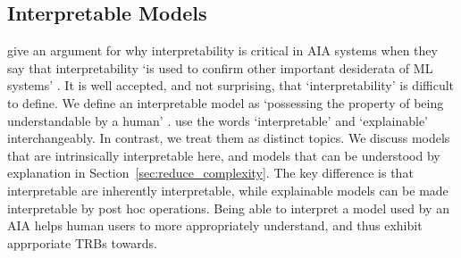 \subsection{Interpretable Models} \label{sec:interp_models}
\citet{Doshi-Velez2017-xy} give an argument for why interpretability is critical in AIA systems when they say that interpretability `is used to confirm other important desiderata of ML systems' . It is well accepted, and not surprising, that `interpretability' is difficult to define. We define an interpretable model as `possessing the property of being understandable by a human' . \cite{Doshi-Velez2017-xy} use the words `interpretable' and `explainable' interchangeably. In contrast, we treat them as distinct topics. We discuss models that are intrinsically interpretable here, and models that can be understood by explanation in Section~\ref{sec:reduce_complexity}.  The key difference is that interpretable are inherently interpretable, while explainable models can be made interpretable by post hoc operations. Being able to interpret a model used by an AIA helps human users to more appropriately understand, and thus exhibit apprporiate TRBs towards. 

